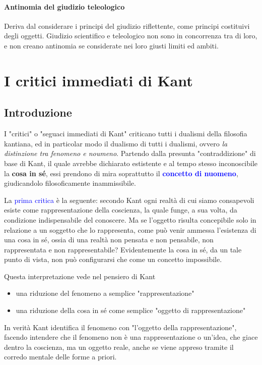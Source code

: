 \documentclass[a4paper, twoside, titlepage]{book}
\renewcommand{\emph}[1]{\textcolor{blue}{#1}}
\begin{document}
\subsection{Antinomia del giudizio teleologico}

Deriva dal considerare i principi del giudizio riflettente, come principi costituivi degli oggetti. Giudizio scientifico e teleologico non sono in concorrenza tra di loro, e non creano antinomia se considerate nei loro giusti limiti ed ambiti.


\part{I critici immediati di Kant}

\chapter{Introduzione}

I "critici" o "seguaci immediati di Kant" criticano tutti i dualismi della filosofia kantiana, ed in particolar modo il dualismo di tutti i dualismi, ovvero \textit{la distinzione tra fenomeno e noumeno}. Partendo dalla presunta "contraddizione" di base di Kant, il quale avrebbe dichiarato estistente e al tempo stesso inconoscibile la \textbf{cosa in sé}, essi prendono di mira soprattutto il \emph{\textbf{concetto di nuomeno}}, giudicandolo filosoficamente inammissibile.

La \emph{prima critica} è la seguente: secondo Kant ogni realtà di cui siamo consapevoli esiste come rappresentazione della coscienza, la quale funge, a sua volta, da condizione indispensabile del conoscere. Ma se l'oggetto risulta concepibile solo in relazione a un soggetto che lo rappresenta, come può venir ammessa l'esistenza di una cosa in sé, ossia di una realtà non pensata e non pensabile, non rappresentata e non rappresentabile?
Evidentemente la cosa in sé, da un tale punto di vista, non può configurarsi che come un concetto impossibile.

Questa interpretazione vede nel pensiero di Kant
\begin{itemize}
\item una riduzione del fenomeno a semplice "rappresentazione"
\item una riduzione della cosa in sé come semplice "oggetto di rappresentazione"
\end{itemize}

In verità Kant identifica il fenomeno con "l'oggetto della rappresentazione", facendo intendere che il fenomeno non è una rappresentazione o un'idea, che giace dentro la coscienza, ma un oggetto reale, anche se viene appreso tramite il corredo mentale delle forme a priori.
\end{document}
